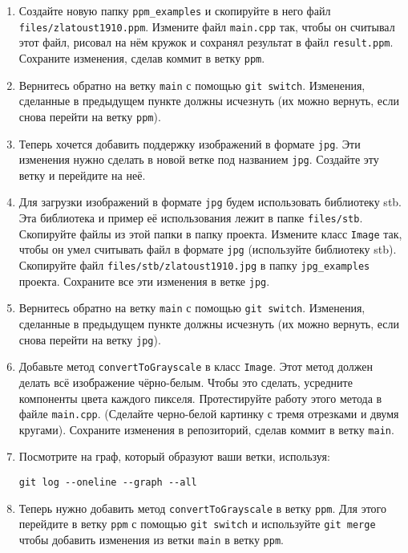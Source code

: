 \documentclass{article}
\begin{document}
\begin{enumerate}
\item Создайте новую папку \texttt{ppm\_examples} и скопируйте в него файл \texttt{files/zlatoust1910.ppm}. Измените файл \texttt{main.cpp} так, чтобы он считывал этот файл, рисовал на нём кружок и сохранял результат в файл \texttt{result.ppm}. Сохраните изменения, сделав коммит в ветку \texttt{ppm}. 

\item Вернитесь обратно на ветку \texttt{main} с помощью \texttt{git switch}. Изменения, сделанные в предыдущем пункте должны исчезнуть (их можно вернуть, если снова перейти на ветку \texttt{ppm}).

\item Теперь хочется добавить поддержку изображений в формате \texttt{jpg}. Эти изменения нужно сделать в новой ветке под названием \texttt{jpg}. Создайте эту ветку и перейдите на неё.

\item Для загрузки изображений в формате \texttt{jpg} будем использовать библиотеку stb. Эта библиотека и пример её использования лежит в папке \texttt{files/stb}. Скопируйте файлы из этой папки в папку проекта. Измените класс \texttt{Image} так, чтобы он умел считывать файл в формате \texttt{jpg} (используйте библиотеку stb). Скопируйте файл \texttt{files/stb/zlatoust1910.jpg} в папку \texttt{jpg\_examples} проекта. Сохраните все эти изменения в ветке \texttt{jpg}.

\item Вернитесь обратно на ветку \texttt{main} с помощью \texttt{git switch}. Изменения, сделанные в предыдущем пункте должны исчезнуть (их можно вернуть, если снова перейти на ветку \texttt{jpg}).

\item Добавьте метод \texttt{convertToGrayscale} в класс \texttt{Image}. Этот метод должен делать всё изображение чёрно-белым. Чтобы это сделать, усредните компоненты цвета каждого пикселя. Протестируйте работу этого метода в файле \texttt{main.cpp}. (Сделайте черно-белой картинку с тремя отрезками и двумя кругами). Сохраните изменения в репозиторий, сделав коммит в ветку \texttt{main}.

\item Посмотрите на граф, который образуют ваши ветки, используя:
\begin{verbatim}
git log --oneline --graph --all
\end{verbatim}

\item Теперь нужно добавить метод \texttt{convertToGrayscale} в ветку \texttt{ppm}. Для этого перейдите в ветку \texttt{ppm} с помощью \texttt{git switch} и используйте \texttt{git merge} чтобы добавить изменения из ветки \texttt{main} в ветку \texttt{ppm}.


\end{enumerate}
\end{document}

